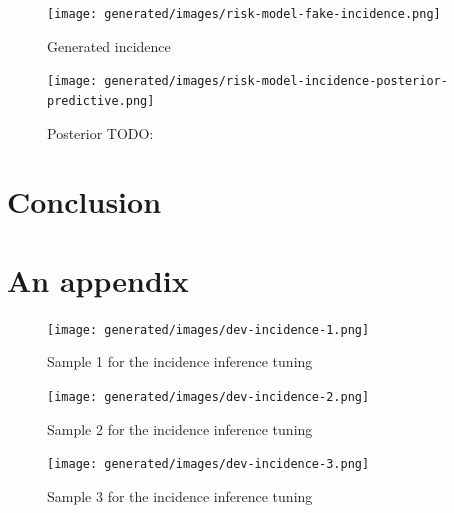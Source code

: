 \documentclass[
  digital, %
  oneside, %
  lof,     %
  lot,     %
]{fithesis4}
\begin{document}
\begin{figure}[h]
  \begin{center}
    \texttt{[image: generated/images/risk-model-fake-incidence.png]}
  \end{center}
  \caption{Generated incidence}
  \label{fig:risk-model-fake-incidence}
\end{figure}

\begin{figure}[h]
  \begin{center}
    \texttt{[image: generated/images/risk-model-incidence-posterior-predictive.png]}
  \end{center}
  \caption{Posterior TODO:}
  \label{fig:risk-model-fake-incidence}
\end{figure}


\chapter{Conclusion}


\cite{blei2018}





\cite{pfeffer2016}
\cite{davidson-pilon2015}


\printbibliography[heading=bibintoc]

\appendix

\chapter{An appendix}




\begin{figure}[H]
  \begin{center}
    \texttt{[image: generated/images/dev-incidence-1.png]}
  \end{center}
  \caption{Sample 1 for the incidence inference tuning}
  \label{fig:dev-incidence-1}
\end{figure}

\begin{figure}[H]
  \begin{center}
    \texttt{[image: generated/images/dev-incidence-2.png]}
  \end{center}
  \caption{Sample 2 for the incidence inference tuning}
  \label{fig:dev-incidence-2}
\end{figure}

\begin{figure}[H]
  \begin{center}
    \texttt{[image: generated/images/dev-incidence-3.png]}
  \end{center}
  \caption{Sample 3 for the incidence inference tuning}
  \label{fig:dev-incidence-3}
\end{figure}
\end{document}
